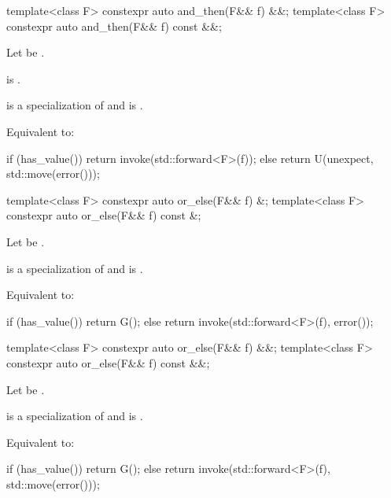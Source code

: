 %
\begin{itemdecl}
template<class F> constexpr auto and_then(F&& f) &&;
template<class F> constexpr auto and_then(F&& f) const &&;
\end{itemdecl}

\begin{itemdescr}
\pnum
Let  be .

\pnum
\constraints
{} is .

\pnum
\mandates
{} is a specialization of  and
 is .

\pnum
\effects
Equivalent to:
\begin{codeblock}
if (has_value())
  return invoke(std::forward<F>(f));
else
  return U(unexpect, std::move(error()));
\end{codeblock}
\end{itemdescr}

%
\begin{itemdecl}
template<class F> constexpr auto or_else(F&& f) &;
template<class F> constexpr auto or_else(F&& f) const &;
\end{itemdecl}

\begin{itemdescr}
\pnum
Let  be .

\pnum
\mandates
{} is a specialization of  and
 is .

\pnum
\effects
Equivalent to:
\begin{codeblock}
if (has_value())
  return G();
else
  return invoke(std::forward<F>(f), error());
\end{codeblock}
\end{itemdescr}

%
\begin{itemdecl}
template<class F> constexpr auto or_else(F&& f) &&;
template<class F> constexpr auto or_else(F&& f) const &&;
\end{itemdecl}

\begin{itemdescr}
\pnum
Let  be
.

\pnum
\mandates
{} is a specialization of  and
 is .

\pnum
\effects
Equivalent to:
\begin{codeblock}
if (has_value())
  return G();
else
  return invoke(std::forward<F>(f), std::move(error()));
\end{codeblock}
\end{itemdescr}

